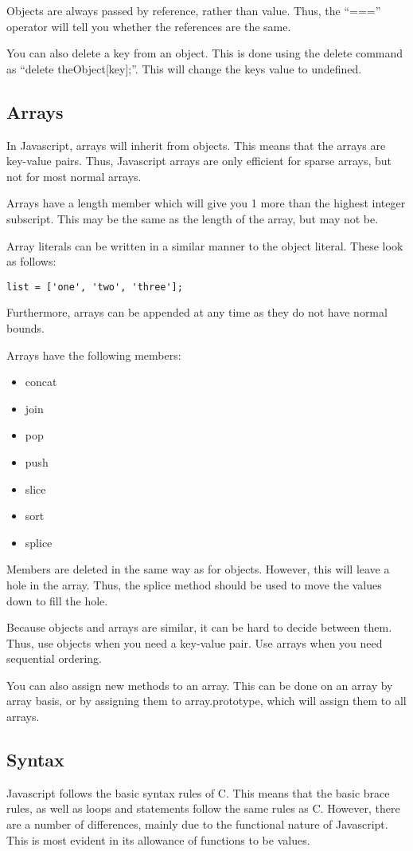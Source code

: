 			Objects are always passed by reference, rather than value.
			Thus, the ``==='' operator will tell you whether the references are the same.

			You can also delete a key from an object.
			This is done using the delete command as ``delete theObject[key];''.
			This will change the keys value to undefined.
		\subsection{Arrays}
			In Javascript, arrays will inherit from objects.
			This means that the arrays are key-value pairs.
			Thus, Javascript arrays are only efficient for sparse arrays, but not for most normal arrays.

			Arrays have a length member which will give you 1 more than the highest integer subscript.
			This may be the same as the length of the array, but may not be.

			Array literals can be written in a similar manner to the object literal.
			These look as follows:
			\begin{verbatim}
list = ['one', 'two', 'three'];
			\end{verbatim}
			Furthermore, arrays can be appended at any time as they do not have normal bounds.

			Arrays have the following members:
			\begin{itemize}
				\item concat
				\item join
				\item pop
				\item push
				\item slice
				\item sort
				\item splice
			\end{itemize}

			Members are deleted in the same way as for objects.
			However, this will leave a hole in the array.
			Thus, the splice method should be used to move the values down to fill the hole.

			Because objects and arrays are similar, it can be hard to decide between them.
			Thus, use objects when you need a key-value pair.
			Use arrays when you need sequential ordering.

			You can also assign new methods to an array.
			This can be done on an array by array basis, or by assigning them to array.prototype,
			which will assign them to all arrays.
		\subsection{Syntax}
			Javascript follows the basic syntax rules of C.
			This means that the basic brace rules, as well as loops and statements follow the same rules as C.
			However, there are a number of differences, mainly due to the functional nature of Javascript.
			This is most evident in its allowance of functions to be values.

